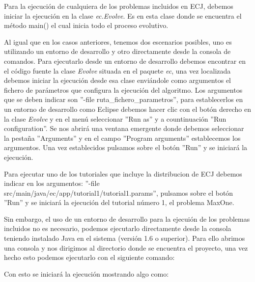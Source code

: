 Para la ejecuci\'on de cualquiera de los problemas incluidos en ECJ, debemos iniciar la ejecuci\'on en la clase \textit{ec.Evolve}. Es en esta clase donde se encuentra el m\'etodo main() el cual inicia todo el proceso evolutivo.

Al igual que en los casos anteriores, tenemos dos escenarios posibles, uno es utilizando un entorno de desarrollo y otro directamente desde la consola de comandos. Para ejecutarlo desde un entorno de desarrollo debemos encontrar en el c\'odigo fuente la clase \textit{Evolve} situada en el paquete \textit{ec}, una vez localizada debemos iniciar la ejecuci\'on desde esa clase envi\'andole como argumentos el fichero de par\'ametros que configura la ejecuci\'on del algoritmo. Los argumentos que se deben indicar son ''-file ruta\_fichero\_parametros'', para establecerlos en un entorno de desarrollo como Eclipse debemos hacer clic con el bot\'on derecho en la clase \textit{Evolve} y en el men\'u seleccionar ''Run as'' y a countinuaci\'on ''Run configuration''. Se nos abrir\'a una ventana emergente donde debemos seleccionar la pesta\~na ''Arguments'' y en el campo ''Program arguments'' establecemos los argumentos. Una vez establecidos pulsamos sobre el bot\'on ''Run'' y se iniciar\'a la ejecuci\'on.

Para ejecutar uno de los tutoriales que incluye la distribucion de ECJ debemos indicar en los argumentos: ''-file src/main/java/ec/app/tutorial1/tutorial1.params'', pulsamos sobre el bot\'on ''Run'' y se iniciar\'a la ejecuci\'on del tutorial n\'umero 1, el problema MaxOne.

Sin embargo, el uso de un entorno de desarrollo para la ejecui\'on de los problemas incluidos no es necesario, podemos ejecutarlo directamente desde la consola teniendo instalado Java en el sistema (versi\'on 1.6 o superior). Para ello abrimos una consola y nos dirigimos al directorio donde se encuentra el proyecto, una vez hecho esto podemos ejecutarlo con el siguiente comando:


Con esto se iniciar\'a la ejecuci\'on mostrando algo como:


